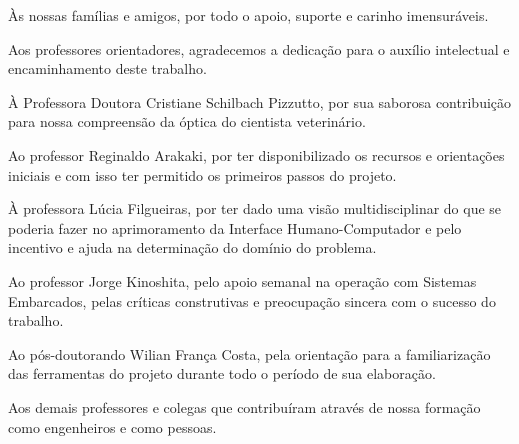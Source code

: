 \begin{agradecimentos}
Às nossas famílias e amigos, por todo o apoio, suporte e carinho imensuráveis.

Aos professores orientadores, agradecemos a dedicação para o auxílio intelectual e encaminhamento deste trabalho.

À Professora Doutora Cristiane Schilbach Pizzutto, por sua saborosa contribuição para nossa compreensão da óptica do cientista veterinário.

Ao professor Reginaldo Arakaki, por ter disponibilizado os recursos e orientações iniciais e com isso ter permitido os primeiros passos do projeto.

À professora Lúcia Filgueiras, por ter dado uma visão multidisciplinar do que se poderia fazer no aprimoramento da Interface Humano-Computador e pelo incentivo e ajuda na determinação do domínio do problema.

Ao professor Jorge Kinoshita, pelo apoio semanal na operação com Sistemas Embarcados, pelas críticas construtivas e preocupação sincera com o sucesso do trabalho.

Ao pós-doutorando Wilian França Costa, pela orientação para a familiarização das ferramentas do projeto durante todo o período de sua elaboração.

Aos demais professores e colegas que contribuíram através de nossa formação como engenheiros e como pessoas.
\end{agradecimentos}
